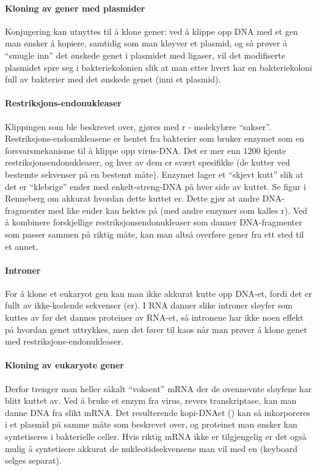 \paragraph{Kloning av gener med plasmider} Konjugering kan utnyttes til å klone gener: ved å klippe opp DNA med et gen man ønsker å kopiere, samtidig som man kløyver et plasmid, og så prøver å ``smugle inn'' det ønskede genet i plasmidet med ligaser, vil det modifiserte plasmidet spre seg i bakteriekolonien slik at man etter hvert har en bakteriekoloni full av bakterier med det ønskede genet (inni et plasmid). 

\paragraph{Restriksjons-endonukleaser} Klippingen som ble beskrevet over, gjøres med r - molekylære ``sakser''. Restriksjons-endonukleasene er hentet fra bakterier som bruker enzymet som en forsvarsmekanisme til å klippe opp virus-DNA. Det er mer enn 1200 kjente restriksjonsendonukleaser, og hver av dem er svært spesifikke (de kutter ved bestemte sekvenser på en bestemt måte). Enzymet lager et ``skjevt kutt'' slik at det er ``klebrige'' ender med enkelt-streng-DNA på hver side av kuttet. Se figur i Renneberg om akkurat hvordan dette kuttet er. Dette gjør at andre DNA-fragmenter med like ender kan hektes på (med andre enzymer som kalles r). Ved å kombinere forskjellige restriksjonsendonukleaser som danner DNA-fragmenter som passer sammen på riktig måte, kan man altså overføre gener fra ett sted til et annet.

\paragraph{Introner} For å klone et eukaryot gen kan man ikke akkurat kutte opp DNA-et, fordi det er fullt av ikke-kodende sekvenser (er). I RNA danner slike introner sløyfer som kuttes av før det dannes proteiner av RNA-et, så intronene har ikke noen effekt på hvordan genet uttrykkes, men det fører til kaos når man prøver å klone genet med restriksjons-endonukleaser.

\paragraph{Kloning av eukaryote gener} Derfor trenger man heller såkalt ``voksent'' mRNA der de ovennevnte sløyfene har blitt kuttet av. Ved å bruke et enzym fra virus, revers transkriptase, kan man danne DNA fra slikt mRNA. Det resulterende kopi-DNAet () kan så inkorporeres i et plasmid på samme måte som beskrevet over, og proteinet man ønsker kan syntetiseres i bakterielle celler. Hvis riktig mRNA ikke er tilgjengelig er det også mulig å syntetisere akkurat de nukleotidsekvensene man vil med en  (keyboard selges separat).

